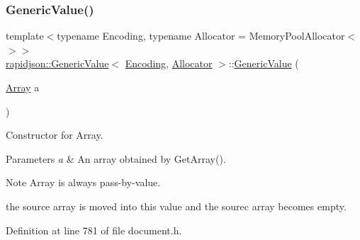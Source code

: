 \subsubsection{\texorpdfstring{GenericValue()}{GenericValue()}\hspace{0.1cm}{\footnotesize\ttfamily [16/17]}}
{\footnotesize\ttfamily template$<$typename Encoding, typename Allocator = Memory\+Pool\+Allocator$<$$>$$>$ \\
\mbox{\hyperlink{classrapidjson_1_1_generic_value}{rapidjson\+::\+Generic\+Value}}$<$ \mbox{\hyperlink{classrapidjson_1_1_encoding}{Encoding}}, \mbox{\hyperlink{classrapidjson_1_1_allocator}{Allocator}} $>$\+::\mbox{\hyperlink{classrapidjson_1_1_generic_value}{Generic\+Value}} (\begin{DoxyParamCaption}\item[{\mbox{\hyperlink{classrapidjson_1_1_generic_value_a81291ad1031afe43aca4719e2989d7dc}{Array}}}]{a }\end{DoxyParamCaption})}



Constructor for Array. 


\begin{DoxyParams}{Parameters}
{\em a} & An array obtained by {\ttfamily Get\+Array()}. \\
\hline
\end{DoxyParams}
\begin{DoxyNote}{Note}
{\ttfamily Array} is always pass-\/by-\/value. 

the source array is moved into this value and the sourec array becomes empty. 
\end{DoxyNote}


Definition at line 781 of file document.\+h.


\begin{DoxyCode}{0}

\end{DoxyCode}
\mbox{\label{classrapidjson_1_1_generic_value_a893da1069660536fd3943a0149206a6e}} 
